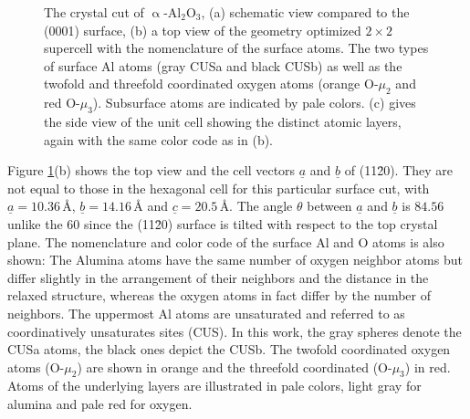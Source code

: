 \documentclass[11pt,DIV=13,BCOR=5mm,a4paper,headinclude]{scrbook}
\renewcommand{\vec}[1]{\underline{#1}}
\begin{document}
\begin{figure}[!h]
             \caption{The crystal cut of $\upalpha$-Al$_2$O$_3$, (a) schematic view compared to the (0001) surface, (b) a top view of the geometry optimized $2\times 2$ supercell with the nomenclature of the surface atoms.
The two types of surface Al atoms (gray CUSa and black CUSb) as well as the twofold and threefold coordinated oxygen atoms (orange O-$\mu_2$ and red O-$\mu_3$).
Subsurface atoms are indicated by pale colors.
(c) gives the side view of the unit cell showing the distinct atomic layers, again with the same color code as in (b).}
            \label{abb:crystal_11-20}
\end{figure}
Figure \ref{abb:crystal_11-20}(b) shows the top view and the cell vectors $\vec{a}$ and $\vec{b}$ of (11\=20).
They are not equal to those in the hexagonal cell for this particular surface cut, with $\vec{a}=10.36\,$\AA, $\vec{b}=14.16\,$\AA{} and $\vec{c}=20.5\,$\AA.
The angle $\theta$ between $\vec{a}$ and $\vec{b}$ is $84.56$\textdegree{} unlike the $60$\textdegree{} since the (11\=20) surface is tilted with respect to the top crystal plane.
The nomenclature and color code of the surface Al and O atoms is also shown: The Alumina atoms have the same number of oxygen neighbor atoms but differ slightly in the arrangement of their neighbors and the distance in the relaxed structure, whereas the oxygen atoms in fact differ by the number of neighbors.
The uppermost Al atoms are unsaturated and referred to as coordinatively unsaturates sites (CUS).
In this work, the gray spheres denote the CUSa atoms, the black ones depict the CUSb.
The twofold coordinated oxygen atoms (O-$\mu_2$) are shown in orange and the threefold coordinated (O-$\mu_3$) in red.
Atoms of the underlying layers are illustrated in pale colors, light gray for alumina and pale red for oxygen.
\end{document}
